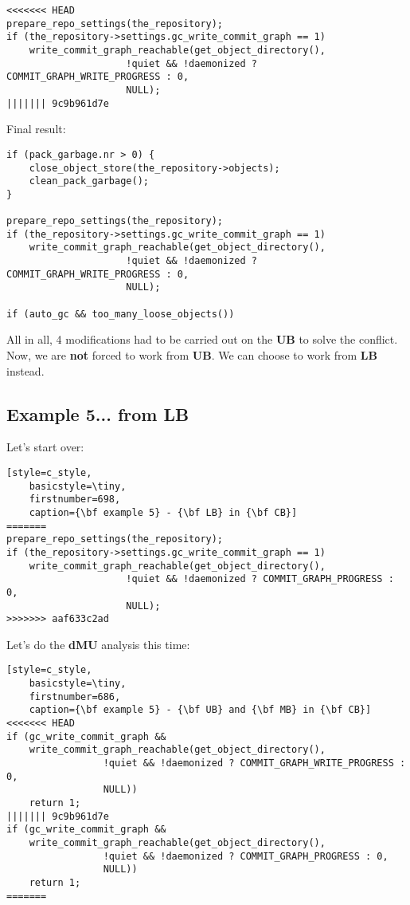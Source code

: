 \begin{lstlisting}[style=c_style,
	basicstyle=\tiny,
	firstnumber=686,
	caption={\bf example 5} - Step 4 - Remove return]
<<<<<<< HEAD
prepare_repo_settings(the_repository);
if (the_repository->settings.gc_write_commit_graph == 1)
	write_commit_graph_reachable(get_object_directory(),
				     !quiet && !daemonized ? COMMIT_GRAPH_WRITE_PROGRESS : 0,
				     NULL);
||||||| 9c9b961d7e
\end{lstlisting}

Final result:
\begin{lstlisting}[style=c_style,
	basicstyle=\tiny,
	firstnumber=681,
	caption={\bf example 5} - final result]
if (pack_garbage.nr > 0) {
	close_object_store(the_repository->objects);
	clean_pack_garbage();
}

prepare_repo_settings(the_repository);
if (the_repository->settings.gc_write_commit_graph == 1)
	write_commit_graph_reachable(get_object_directory(),
				     !quiet && !daemonized ? COMMIT_GRAPH_WRITE_PROGRESS : 0,
				     NULL);

if (auto_gc && too_many_loose_objects())
\end{lstlisting}

All in all, 4 modifications had to be carried out on the {\bf UB} to solve the conflict. Now, we are {\bf not}
forced to work from {\bf UB}. We can choose to work from {\bf LB} instead.

\subsection{Example 5... from LB}

Let's start over:

\begin{lstlisting}[style=c_style,
	basicstyle=\tiny,
	firstnumber=698,
	caption={\bf example 5} - {\bf LB} in {\bf CB}]
=======
prepare_repo_settings(the_repository);
if (the_repository->settings.gc_write_commit_graph == 1)
	write_commit_graph_reachable(get_object_directory(),
				     !quiet && !daemonized ? COMMIT_GRAPH_PROGRESS : 0,
				     NULL);
>>>>>>> aaf633c2ad
\end{lstlisting}

Let's do the {\bf dMU} analysis this time:

\begin{lstlisting}[style=c_style,
	basicstyle=\tiny,
	firstnumber=686,
	caption={\bf example 5} - {\bf UB} and {\bf MB} in {\bf CB}]
<<<<<<< HEAD
if (gc_write_commit_graph &&
    write_commit_graph_reachable(get_object_directory(),
				 !quiet && !daemonized ? COMMIT_GRAPH_WRITE_PROGRESS : 0,
				 NULL))
	return 1;
||||||| 9c9b961d7e
if (gc_write_commit_graph &&
    write_commit_graph_reachable(get_object_directory(),
				 !quiet && !daemonized ? COMMIT_GRAPH_PROGRESS : 0,
				 NULL))
	return 1;
=======
\end{lstlisting}

